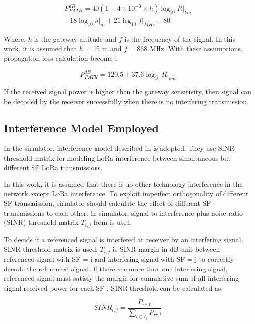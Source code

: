 \documentclass[conference]{IEEEtran}
\begin{document}
\begin{equation} \label{eq:propagation_loss}
\begin{split}
P^{dB}_{PATH} = 40(1 - 4 \times 10^{-3} \times h){\log_{10} R|_{km}} \\
- 18 {\log_{10} h|_{m}} + 21 {\log_{10} f|_{MHz}} + 80
\end{split}
\end{equation}

Where, $h$ is the gateway altitude and $f$ is the frequency of the signal. In this work, it is assumed that $h$ = 15 m and $f$ = 868 MHz. With these assumptions, propagation loss calculation become \cite{7996384}:

\begin{equation} \label{eq:propagation_loss_simplified}
P^{dB}_{PATH} = 120.5 + 37.6 {\log_{10} R|_{km}}
\end{equation}

If the received signal power is higher than the gateway sensitivity, then signal can be decoded by the receiver successfully when there is no interfering transmission.

\subsection{Interference Model Employed}
In the simulator, interference model described in \cite{7996384} is adopted. They use SINR threshold matrix for modeling LoRa interference between simultaneous but different SF LoRa transmissions.

In this work, it is assumed that there is no other technology interference in the network except LoRa interference. To exploit imperfect orthogonality of different SF transmission, simulator should calculate the effect of different SF transmissions to each other. In simulator, signal to interference plus noise ratio (SINR) threshold matrix $T_{i,j}$ from \cite{goursaud:hal-01231221} is used.

To decide if a referenced signal is interfered at receiver by an interfering signal, SINR threshold matrix is used. $T_{i,j}$ is SINR margin in dB unit between referenced signal with SF = i and interfering signal with SF = j to correctly decode the referenced signal. If there are more than one interfering signal, referenced signal must satisfy the margin for cumulative sum of all interfering signal received power for each SF \cite{7996384}. SINR threshold can be calculated as:

\begin{equation} \label{eq:sinr_db}
SINR_{i,j} = \dfrac{P_{rc,0}}{\sum_{l \in I_j} P_{rc,l}}
\end{equation}
\end{document}
